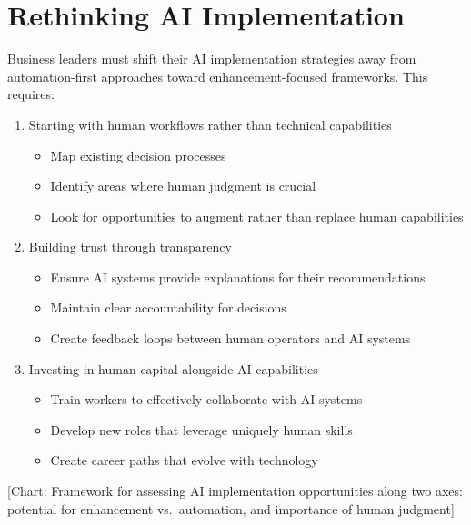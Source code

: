 \documentclass[
  Letterpaper,
]{scrbook}
\providecommand{\tightlist}{%
  \setlength{\itemsep}{0pt}\setlength{\parskip}{0pt}}\usepackage{longtable,booktabs,array}
\begin{document}
\section{Rethinking AI
Implementation}\label{rethinking-ai-implementation}

Business leaders must shift their AI implementation strategies away from
automation-first approaches toward enhancement-focused frameworks. This
requires:

\begin{enumerate}
\def\labelenumi{\arabic{enumi}.}
\tightlist
\item
  Starting with human workflows rather than technical capabilities

  \begin{itemize}
  \tightlist
  \item
    Map existing decision processes
  \item
    Identify areas where human judgment is crucial
  \item
    Look for opportunities to augment rather than replace human
    capabilities
  \end{itemize}
\item
  Building trust through transparency

  \begin{itemize}
  \tightlist
  \item
    Ensure AI systems provide explanations for their recommendations
  \item
    Maintain clear accountability for decisions
  \item
    Create feedback loops between human operators and AI systems
  \end{itemize}
\item
  Investing in human capital alongside AI capabilities

  \begin{itemize}
  \tightlist
  \item
    Train workers to effectively collaborate with AI systems
  \item
    Develop new roles that leverage uniquely human skills
  \item
    Create career paths that evolve with technology
  \end{itemize}
\end{enumerate}

{[}Chart: Framework for assessing AI implementation opportunities along
two axes: potential for enhancement vs.~automation, and importance of
human judgment{]}
\end{document}

